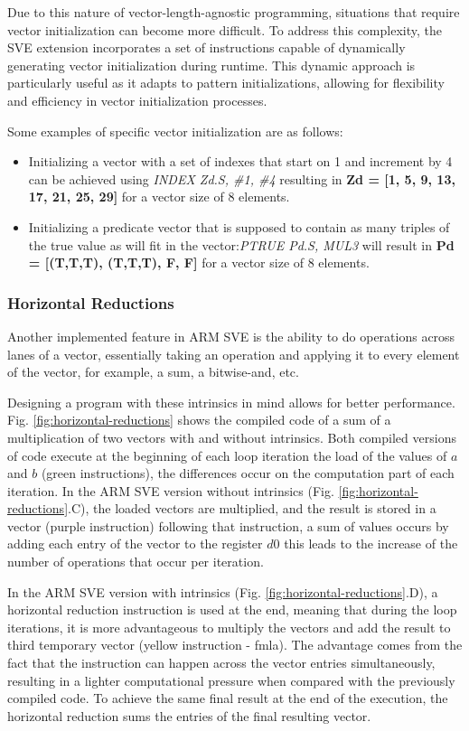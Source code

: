 Due to this nature of vector-length-agnostic programming, situations that require vector initialization can become more difficult. To address this complexity, the SVE extension incorporates a set of instructions capable of dynamically generating vector initialization during runtime. This dynamic approach is particularly useful as it adapts to pattern initializations, allowing for flexibility and efficiency in vector initialization processes.

Some examples of specific vector initialization are as follows:
\begin{itemize}
    \item Initializing a vector with a set of indexes that start on 1 and increment by 4 can be achieved using \textit{INDEX Zd.S, \#1, \#4} resulting in \textbf{Zd = [1, 5, 9, 13, 17, 21, 25, 29]} for a vector size of 8 elements.
    \item Initializing a predicate vector that is supposed to contain as many triples of the true value as will fit in the vector:\textit{PTRUE Pd.S, MUL3} will result in  \textbf{Pd = [(T,T,T), (T,T,T), F, F]} for a vector size of 8 elements.
\end{itemize}

\subsubsection{Horizontal Reductions}

Another implemented feature in ARM SVE is the ability to do operations across lanes of a vector, essentially taking an operation and applying it to every element of the vector, for example, a sum, a bitwise-and, etc. 

Designing a program with these intrinsics in mind allows for better performance. Fig. \ref{fig:horizontal-reductions} shows the compiled code of a sum of a multiplication of two vectors with and without intrinsics. Both compiled versions of code execute at the beginning of each loop iteration the load of the values of $a$ and $b$ (green instructions), the differences occur on the computation part of each iteration. In the ARM SVE version without intrinsics (Fig. \ref{fig:horizontal-reductions}.C), the loaded vectors are multiplied, and the result is stored in a vector (purple instruction) following that instruction, a sum of values occurs by adding each entry of the vector to the register $d0$ this leads to the increase of the number of operations that occur per iteration.

In the ARM SVE version with intrinsics (Fig. \ref{fig:horizontal-reductions}.D), a horizontal reduction instruction is used at the end, meaning that during the loop iterations, it is more advantageous to multiply the vectors and add the result to third temporary vector (yellow instruction - fmla). The advantage comes from the fact that the instruction can happen across the vector entries simultaneously, resulting in a lighter computational pressure when compared with the previously compiled code. To achieve the same final result at the end of the execution, the horizontal reduction sums the entries of the final resulting vector.

